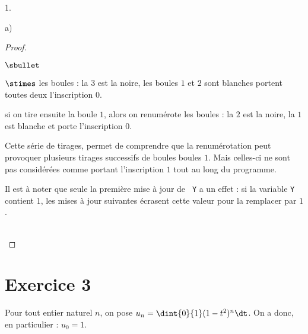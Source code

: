 \documentclass[11pt]{article}%
\begin{document}
\begin{noliste}{1.}
\begin{noliste}{a)}
\begin{proof}
\begin{remarkL}{.98}
\begin{noliste}{$\sbullet$}
\begin{noliste}{$\stimes$}
            les boules : la $3$ est la noire, les boules $1$ et $2$
            sont blanches portent toutes deux l'inscription $0$.
          \item si on tire ensuite la boule $1$, alors on renumérote
            les boules : la $2$ est la noire, la $1$ est blanche et
            porte l'inscription $0$.
          \end{noliste}
          Cette série de tirages, permet de comprendre que la
          renumérotation peut provoquer plusieurs tirages successifs
          de boules boules $1$. Mais celles-ci ne sont pas considérées
          comme portant l'inscription $1$ tout au long du programme.

        \item Il est à noter que seule la première mise à jour de {\tt
            Y} a un effet : si la variable {\tt Y} contient $1$, les
          mises à jour suivantes écrasent cette valeur pour la
          remplacer par $1$.
        \end{noliste}
      \end{remarkL}~\\[-1.5cm]
    \end{proof}
  \end{noliste}
\end{noliste}


\newpage


\section*{Exercice 3}

\noindent
Pour tout entier naturel $n$, on pose $u_n = \dint{0}{1} (1- t^2)^n
\dt$. On a donc, en particulier : $u_0=1$.
\end{document}
